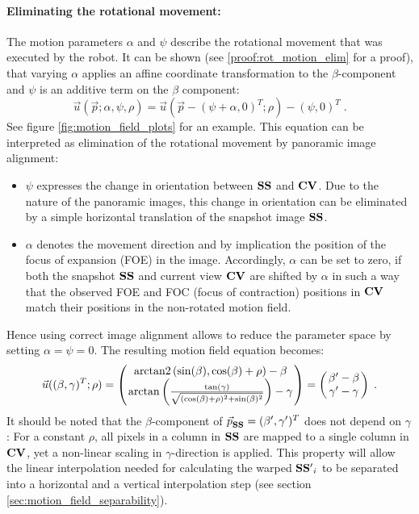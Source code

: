 \paragraph{Eliminating the rotational movement:} The motion parameters $\alpha$ and $\psi$ describe the rotational movement that was executed by the robot. It can be shown (see \ref{proof:rot_motion_elim} for a proof), that varying $\alpha$ applies an affine coordinate transformation to the $\beta$-component and $\psi$ is an additive term on the $\beta$ component:
\begin{equation}
 \vec u(\vec p; \alpha, \psi, \rho) = \vec u(\vec p - (\psi + \alpha, 0)^T; \rho) - (\psi, 0)^T
 \label{eqn:rot_motion_elim} \; .
\end{equation}
See figure \ref{fig:motion_field_plots} for an example. This equation can be interpreted as elimination of the rotational movement by panoramic image alignment:
\begin{itemize}
 \item $\psi$ expresses the change in orientation between $\mathbf{SS}$ and $\mathbf{CV}$. Due to the nature of the panoramic images, this change in orientation can be eliminated by a simple horizontal translation of the snapshot image $\mathbf{SS}$.
 \item $\alpha$ denotes the movement direction and by implication the position of the focus of expansion (FOE) in the image. Accordingly, $\alpha$ can be set to zero, if both the snapshot $\mathbf{SS}$ and current view $\mathbf{CV}$ are shifted by $\alpha$ in such a way that the observed FOE and FOC (focus of contraction) positions in $\mathbf{CV}$ match their positions in the non-rotated motion field.
\end{itemize}
Hence using correct image alignment allows to reduce the parameter space by setting $\alpha = \psi = 0$. The resulting motion field equation becomes:
\begin{equation}
  \vec u((\beta, \gamma)^T; \rho)
  = \begmat
    \atantwo
      \left(\sin(\beta), \cos(\beta) + \rho\right) - \beta \\
    \arctan
      \left(
	\frac{
	\tan(\gamma)
      }{
      \sqrt{
    (\cos(\beta) + \rho)^{2} +
    \sin(\beta)^{2}}
      }
    \right) - \gamma
  \finmat
  =
  \begmat
    \beta' - \beta \\
    \gamma' - \gamma
  \finmat
  \label{eqn:flow_template} \; .
\end{equation}
It should be noted that the $\beta$-component of $\vec p_{\img{SS}} = (\beta', \gamma')^T$ does not depend on $\gamma$: For a constant $\rho$, all pixels in a column in $\mathbf{SS}$ are mapped to a single column in $\mathbf{CV}$, yet a non-linear scaling in $\gamma$-direction is applied. This property will allow the linear interpolation needed for calculating the warped $\mathbf{SS'}_i$ to be separated into a horizontal and a vertical interpolation step (see section \ref{sec:motion_field_separability}).

